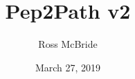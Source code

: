 \documentclass{l4proj}
\begin{document}
\title{Pep2Path v2}
\author{Ross McBride}
\date{March 27, 2019}

\maketitle

\begin{abstract}
\end{abstract}


%
%
%
\educationalconsent


\tableofcontents

%
%
%
%
%
%
%
\end{document}
